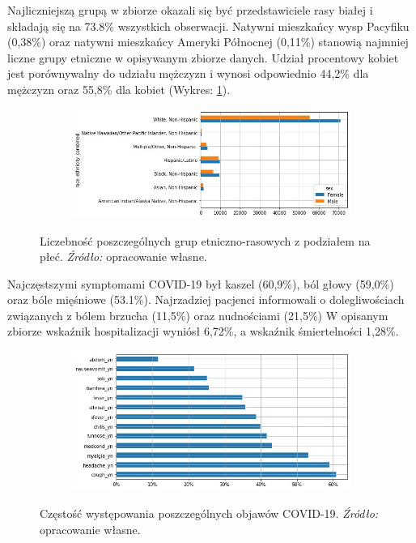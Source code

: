\documentclass[polish, twoside, 12pt, a4paper]{article}
\theoremstyle{definition}
\theoremstyle{plain}
\theoremstyle{remark}
\begin{document}
Najliczniejszą grupą w zbiorze okazali się być przedstawiciele rasy białej i składają się na 73.8\% wszystkich obserwacji. Natywni mieszkańcy wysp Pacyfiku (0,38\%) oraz natywni mieszkańcy Ameryki Północnej (0,11\%) stanowią najmniej liczne grupy etniczne w opisywanym zbiorze danych. Udział procentowy kobiet jest porównywalny do udziału mężczyzn i wynosi odpowiednio 44,2\% dla mężczyzn oraz 55,8\% dla kobiet (Wykres: \ref{figure:sex-race-count}).

\begin{figure}[H]
  \centering
  \begin{subfigure}[t]{\textwidth}
    \includegraphics[width=15cm]{race_sex_count_plot.jpg}
  \end{subfigure}
  \captionsetup{margin=10pt,font=small,labelfont=bf,width=.8\textwidth}
  \caption{Liczebność poszczególnych grup etniczno-rasowych z podziałem na płeć. \textit{Źródło:} opracowanie własne.}\label{figure:sex-race-count}
\end{figure}

Najczęstszymi symptomami COVID-19 był kaszel (60,9\%), ból głowy (59,0\%) oraz bóle mięśniowe (53.1\%). Najrzadziej pacjenci informowali o dolegliwościach związanych z bólem brzucha (11,5\%) oraz nudnościami (21,5\%) W opisanym zbiorze wskaźnik hospitalizacji wyniósł 6,72\%, a wskaźnik śmiertelności 1,28\%.

\begin{figure}[H]
  \centering
  \begin{subfigure}[t]{\textwidth}
    \includegraphics[width=15cm]{symptoms-freq.jpg}
  \end{subfigure}
  \captionsetup{margin=10pt,font=small,labelfont=bf,width=.8\textwidth}
  \caption{Częstość występowania poszczególnych objawów COVID-19. \textit{Źródło:} opracowanie własne.}\label{fig:figure:xx4}
\end{figure}
\end{document}

